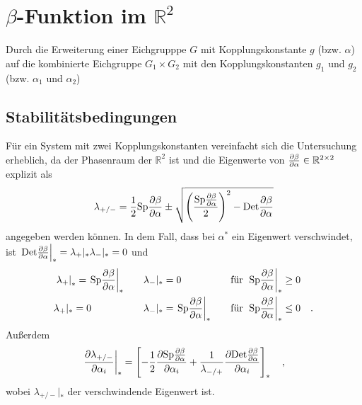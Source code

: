 \clearpage
\section{$\beta$-Funktion im $\mathbb{R}^2$}\label{beta_im_R2}
  Durch die Erweiterung einer Eichgrupppe $G$ mit Kopplungskonstante $g$ (bzw. $\alpha$) auf die 
  kombinierte Eichgruppe $G_1\times G_2$ mit den Kopplungskonstanten $g_1$ und $g_2$ (bzw. 
  $\alpha_1$ und $\alpha_2$)

  \subsection{Stabilitätsbedingungen}
    Für ein System mit zwei Kopplungskonstanten vereinfacht sich die Untersuchung erheblich, 
    da der Phasenraum der $\mathbb{R}^2$ ist und die Eigenwerte von 
    $\frac{\partial \beta}{\partial \alpha} \in\mathbb{R}^{2\times 2}$ 
    explizit als 
    \begin{equation}
    \lambda_{+/-}=\frac12 \text{Sp} \frac{\partial \beta}{\partial \alpha} \pm \sqrt{ \left( \frac{\text{Sp} \frac{\partial \beta}{\partial \alpha}}{2} \right)^2-\text{Det} \frac{\partial \beta}{\partial \alpha} }
    \end{equation}
    angegeben werden können. In dem Fall, dass bei $\alpha^*$ ein Eigenwert verschwindet, ist 
    $\left.\text{Det} \frac{\partial \beta}{\partial \alpha}\right|_*=\lambda_+|_* \lambda_-|_* = 0$ und
    \begin{alignat}{3}
    &\left.\lambda_+\right|_* = \left.\text{Sp} \frac{\partial \beta}{\partial \alpha}\right|_* \quad && \lambda_-|_*=0  
    \quad && \text{für }\left.\text{Sp} \frac{\partial \beta}{\partial \alpha}\right|_*\geq 0 \\
    &\lambda_+|_* = 0   \quad && \lambda_-|_*=\left.\text{Sp} \frac{\partial \beta}{\partial \alpha}\right|_*  \quad && 
    \text{für }\left.\text{Sp} \frac{\partial \beta}{\partial \alpha}\right|_*\leq 0 
    \quad .
    \end{alignat}
    Außerdem 
    \begin{equation}
      \left.\frac{\partial \lambda_{+/-}}{\partial \alpha_i}\right|_*=
      \left[-\frac{1}{2} \frac{\partial \text{Sp} \frac{\partial \beta}{\partial \alpha}}{\partial \alpha_i} 
      + \frac{1}{\lambda_{-/+} }
      \frac{\partial \text{Det} \frac{\partial \beta}{\partial \alpha}}{\partial \alpha_i} \right]_*
      \quad ,
    \end{equation}
    wobei $\lambda_{+/-}|_*$ der verschwindende Eigenwert ist.
    
